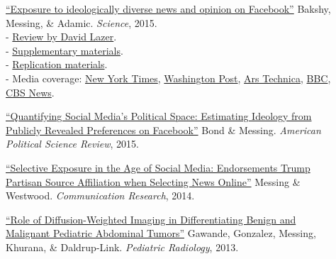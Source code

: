\documentclass[letterpaper,11pt]{article}
\begin{document}
\begin{description}
\item[] \href{https://solomonmg.github.io/pdf/Science-2015-Bakshy-1130-2.pdf}{``Exposure to ideologically diverse news and opinion on Facebook''} Bakshy, Messing, \& Adamic.
\emph{Science}, 2015.  \\
- \href{http://science.sciencemag.org/content/348/6239/1090}{Review by David Lazer}. \\
- \href{http://science.sciencemag.org/content/sci/suppl/2015/05/06/science.aaa1160.DC1/Bakshy-SM.revision.1.pdf}{Supplementary materials}. \\
- \href{http://dx.doi.org/10.7910/DVN/LDJ7MS}{Replication materials}. \\
- Media coverage: \href{http://www.nytimes.com/2015/05/08/technology/facebook-study-disputes-theory-of-political-polarization-among-users.html}{New York Times}, \href{http://www.washingtonpost.com/news/energy-environment/wp/2015/05/07/facebook-study-says-its-mainly-your-fault-not-theirs-that-you-read-things-you-already-agree-with/}{Washington Post}, \href{https://arstechnica.com/science/2015/05/dont-just-blame-facebook-we-build-our-own-bubbles/}{Ars Technica}, \href{http://www.bbc.com/news/science-environment-32606724}{BBC}, \href{http://www.cbsnews.com/news/facebooks-news-feed-limits-your-world-view/}{CBS News}.

\item[] \href{https://solomonmg.github.io/pdf/EstimatingIdeologyFromFacebookPageLikes.pdf}{``Quantifying Social Media's Political Space: Estimating Ideology from Publicly Revealed Preferences on Facebook''} Bond \& Messing. 
\emph{American Political Science Review}, 2015.


\item[] \href{https://www.dropbox.com/s/sl847m7z7uzonro/CH3.pdf}{``Selective Exposure in the Age of Social Media: Endorsements Trump Partisan Source Affiliation when Selecting News Online''} Messing \& Westwood. 
\emph{Communication Research}, 2014.

\item[] \href{https://www.ncbi.nlm.nih.gov/pubmed/23666206}{``Role of Diffusion-Weighted Imaging in Differentiating Benign and Malignant Pediatric Abdominal Tumors''} Gawande, Gonzalez, Messing, Khurana, \& Daldrup-Link. 
\emph{Pediatric Radiology}, 2013.


\end{description}
\end{document}
